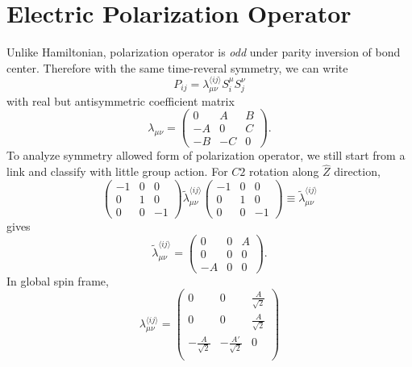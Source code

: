 \documentclass[10pt,nofootinbib]{revtex4}
\begin{document}
\section{Electric Polarization Operator}
		Unlike Hamiltonian, polarization operator is \emph{odd} under parity inversion of bond center. Therefore with the same time-reveral symmetry, we can write 
		\begin{equation}\label{3.1.1}
			P_{ij}=\lambda^{\langle ij \rangle }_{\mu\nu}S_i^\mu S_j^\nu
		\end{equation}
		with real but antisymmetric coefficient matrix
		\begin{equation*}
			\lambda_{\mu\nu}=\left(\begin{array}{ccc}
				0 & A & B \\ -A & 0 & C \\ -B & -C & 0
			\end{array}\right).
		\end{equation*}
		To analyze symmetry allowed form of polarization operator, we still start from a link and classify with little group action. For $C2$ rotation along $\hat{Z}$ direction,
		\begin{equation*}
			\left(\begin{array}{ccc}
				-1 & 0 & 0 \\ 0 & 1 & 0 \\ 0 & 0 & -1
			\end{array}\right)\widetilde{\lambda}_{\mu\nu}^{\langle ij \rangle }
			\left(\begin{array}{ccc}
				-1 & 0 & 0 \\ 0 & 1 & 0 \\ 0 & 0 & -1
			\end{array}\right)\equiv\widetilde{\lambda}_{\mu\nu}^{\langle ij \rangle }
		\end{equation*}
		gives
		\begin{equation}\label{3.1.2}
			\widetilde{\lambda}_{\mu\nu}^{\langle ij \rangle }=\left(\begin{array}{ccc}
				0&0&A\\0&0&0\\-A&0&0
			\end{array}\right).
		\end{equation}
		In global spin frame,
		\begin{equation}\label{3.1.3}
			\lambda_{\mu\nu}^{\langle ij \rangle }=\left(
			\begin{array}{ccc}
			 0 & 0 & \frac{A}{\sqrt{2}} \\
			 0 & 0 & \frac{A}{\sqrt{2}} \\
			 -\frac{A}{\sqrt{2}} & -\frac{A'}{\sqrt{2}} & 0 \\
			\end{array}
			\right)
		\end{equation}
\end{document}
